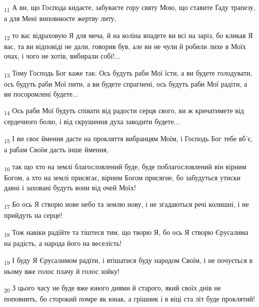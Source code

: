 \begin{tcolorbox}
\textsubscript{11} А ви, що Господа кидаєте, забуваєте гору святу Мою, що ставите Ґаду трапезу, а для Мені виповнюєте жертву литу,
\end{tcolorbox}
\begin{tcolorbox}
\textsubscript{12} то вас відраховую Я для меча, й на коліна впадете ви всі на заріз, бо кликав Я вас, та ви відповіді не дали, говорив був, але ви не чули й робили лихе в Моїх очах, і чого не хотів, вибирали собі!...
\end{tcolorbox}
\begin{tcolorbox}
\textsubscript{13} Тому Господь Бог каже так: Ось будуть раби Мої їсти, а ви будете голодувати, ось будуть раби Мої пити, а ви будете спрагнені, ось будуть раби Мої радіти, а ви посоромлені будете...
\end{tcolorbox}
\begin{tcolorbox}
\textsubscript{14} Ось раби Мої будуть співати від радости серця свого, ви ж кричатимете від сердечного болю, і від скрушення духа заводити будете...
\end{tcolorbox}
\begin{tcolorbox}
\textsubscript{15} І ви своє ймення дасте на прокляття вибранцям Моїм, і Господь Бог тебе вб'є, а рабам Своїм дасть інше ймення,
\end{tcolorbox}
\begin{tcolorbox}
\textsubscript{16} так що хто на землі благословлений буде, буде поблагословлений він вірним Богом, а хто на землі присягає, вірним Богом присягне, бо забудуться утиски давні і заховані будуть вони від очей Моїх!
\end{tcolorbox}
\begin{tcolorbox}
\textsubscript{17} Бо ось Я створю нове небо та землю нову, і не згадаються речі колишні, і не прийдуть на серце!
\end{tcolorbox}
\begin{tcolorbox}
\textsubscript{18} Тож навіки радійте та тіштеся тим, що творю Я, бо ось Я створю Єрусалима на радість, а народа його на веселість!
\end{tcolorbox}
\begin{tcolorbox}
\textsubscript{19} І буду Я Єрусалимом радіти, і втішатися буду народом Своїм, і не почується в ньому вже голос плачу й голос зойку!
\end{tcolorbox}
\begin{tcolorbox}
\textsubscript{20} З цього часу не буде вже юного днями й старого, який своїх днів не поповнить, бо сторокий помре як юнак, а грішник і в віці ста літ буде проклятий!
\end{tcolorbox}
